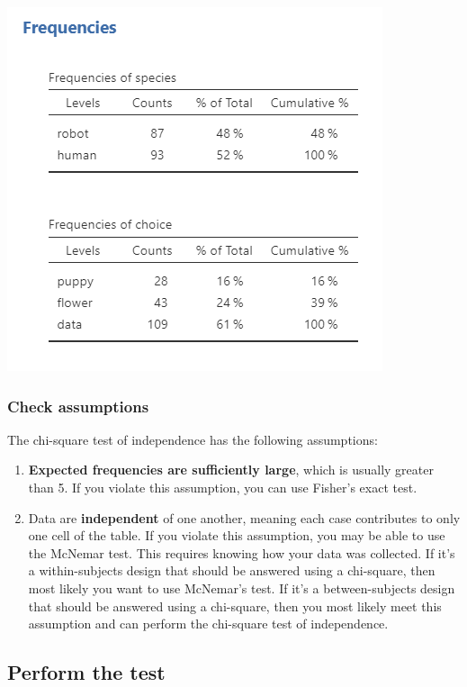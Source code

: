\documentclass[
]{book}
\begin{document}
\includegraphics{images/11-independence/independence_data.png}

\hypertarget{check-assumptions-4}{%
\subsubsection{Check assumptions}\label{check-assumptions-4}}

The chi-square test of independence has the following assumptions:

\begin{enumerate}
\def\labelenumi{\arabic{enumi}.}
\item
  \textbf{Expected frequencies are sufficiently large}, which is usually greater than 5. If you violate this assumption, you can use Fisher's exact test.
\item
  Data are \textbf{independent} of one another, meaning each case contributes to only one cell of the table. If you violate this assumption, you may be able to use the McNemar test. This requires knowing how your data was collected. If it's a within-subjects design that should be answered using a chi-square, then most likely you want to use McNemar's test. If it's a between-subjects design that should be answered using a chi-square, then you most likely meet this assumption and can perform the chi-square test of independence.
\end{enumerate}

\hypertarget{perform-the-test-4}{%
\subsection{Perform the test}\label{perform-the-test-4}}
\end{document}
